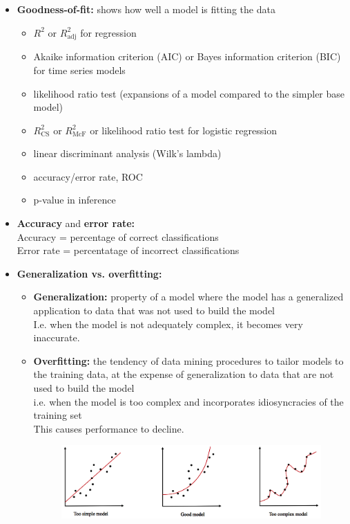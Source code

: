 \documentclass[a4paper, landscape, 6pt, fleqn]{scrartcl}
\renewcommand{\emph}[1]{\textbf{#1}}
\begin{document}
\begin{multicols*}{4}
\begin{itemize}
\item \emph{Goodness-of-fit:} shows how well a model is fitting the data \\
\begin{itemize}
\item $R^2$ or $R^2_\text{adj}$ for regression
\item Akaike information criterion (AIC) or Bayes information criterion (BIC) for time series models
\item likelihood ratio test (expansions of a model compared to the simpler base model)
\item $R^2_\text{CS}$ or $R^2_\text{McF}$ or likelihood ratio test for logistic regression
\item linear discriminant analysis (Wilk's lambda)
\item accuracy/error rate, ROC
\item p-value in inference
\end{itemize}
\item \emph{Accuracy} and \emph{error rate:} \\
Accuracy = percentage of correct classifications \\
Error rate = percentatage of incorrect classifications
\item \emph{Generalization vs. overfitting:}
\begin{itemize}
\item \emph{Generalization:} property of a model where the model has a generalized application to data that was not used to build the model \\
I.e. when the model is not adequately complex, it becomes very inaccurate.
\item \emph{Overfitting:} the tendency of data mining procedures to tailor models to the training data, at the expense of generalization to data that are not used to build the model \\
i.e. when the model is too complex and incorporates idiosyncracies of the training set \\
This causes performance to decline.
\begin{figure}[H]
\centering
\includegraphics[width=1.05 \linewidth]{GeneralizationVsOverfitting}

\end{figure}
\end{itemize}
\end{itemize}
\end{multicols*}
\end{document}
